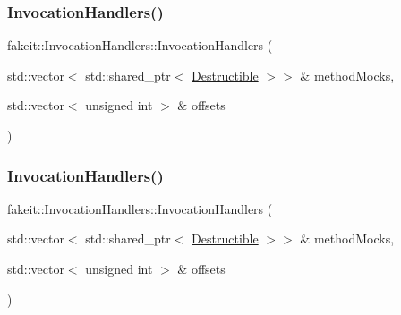 \subsubsection{\texorpdfstring{InvocationHandlers()}{InvocationHandlers()}\hspace{0.1cm}{\footnotesize\ttfamily [7/9]}}
{\footnotesize\ttfamily fakeit\+::\+Invocation\+Handlers\+::\+Invocation\+Handlers (\begin{DoxyParamCaption}\item[{std\+::vector$<$ std\+::shared\+\_\+ptr$<$ \mbox{\hyperlink{classfakeit_1_1Destructible}{Destructible}} $>$$>$ \&}]{method\+Mocks,  }\item[{std\+::vector$<$ unsigned int $>$ \&}]{offsets }\end{DoxyParamCaption})\hspace{0.3cm}{\ttfamily [inline]}}

\mbox{\label{classfakeit_1_1InvocationHandlers_a2fd61aecd4f313aa0ca83b2ab438eeef}} 
\subsubsection{\texorpdfstring{InvocationHandlers()}{InvocationHandlers()}\hspace{0.1cm}{\footnotesize\ttfamily [8/9]}}
{\footnotesize\ttfamily fakeit\+::\+Invocation\+Handlers\+::\+Invocation\+Handlers (\begin{DoxyParamCaption}\item[{std\+::vector$<$ std\+::shared\+\_\+ptr$<$ \mbox{\hyperlink{classfakeit_1_1Destructible}{Destructible}} $>$$>$ \&}]{method\+Mocks,  }\item[{std\+::vector$<$ unsigned int $>$ \&}]{offsets }\end{DoxyParamCaption})\hspace{0.3cm}{\ttfamily [inline]}}

\mbox{\label{classfakeit_1_1InvocationHandlers_a2fd61aecd4f313aa0ca83b2ab438eeef}} 
